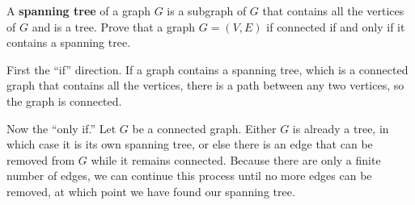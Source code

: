 \question A \textbf{spanning tree} of a graph $G$ is a subgraph of 
$G$ that contains all the vertices of $G$ and is a tree. \newline 
Prove that a graph $G = (V, E)$ if connected if and only if it contains 
a spanning tree.

\begin{solution}
First the “if” direction. If a graph contains a spanning tree, which 
is a connected graph that contains all the vertices, there is a path 
between any two vertices, so the graph is connected.\newline

Now the “only if.” Let $G$ be a connected graph. Either $G$ is already 
a tree, in which case it is its own spanning tree, or else there is an 
edge that can be removed from $G$ while it remains connected. Because 
there are only a finite number of edges, we can continue this process 
until no more edges can be removed, at which point we have found our 
spanning tree.
\end{solution}

\clearpage
